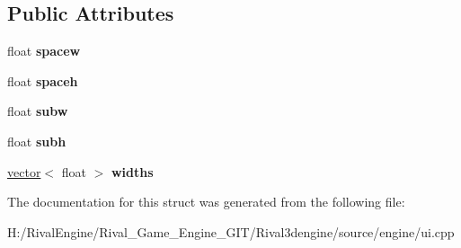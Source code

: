 \subsection*{Public Attributes}
\begin{DoxyCompactItemize}
\item 
\mbox{\label{struct_u_i_1_1_table_a9ad5ae32056d3075c7f196db35a72779}} 
float {\bfseries spacew}
\item 
\mbox{\label{struct_u_i_1_1_table_a85b87ff74df32ab0f6366410bb2eaaa8}} 
float {\bfseries spaceh}
\item 
\mbox{\label{struct_u_i_1_1_table_a1764a6745a68a835098a9ab1970c4cab}} 
float {\bfseries subw}
\item 
\mbox{\label{struct_u_i_1_1_table_a05d37d3e1e2523ec35fc057cc0089da6}} 
float {\bfseries subh}
\item 
\mbox{\label{struct_u_i_1_1_table_af2d77bf7aab5c5fddf27166bf7c93ebd}} 
\hyperlink{structvector}{vector}$<$ float $>$ {\bfseries widths}
\end{DoxyCompactItemize}


The documentation for this struct was generated from the following file\+:\begin{DoxyCompactItemize}
\item 
H\+:/\+Rival\+Engine/\+Rival\+\_\+\+Game\+\_\+\+Engine\+\_\+\+G\+I\+T/\+Rival3dengine/source/engine/ui.\+cpp\end{DoxyCompactItemize}
